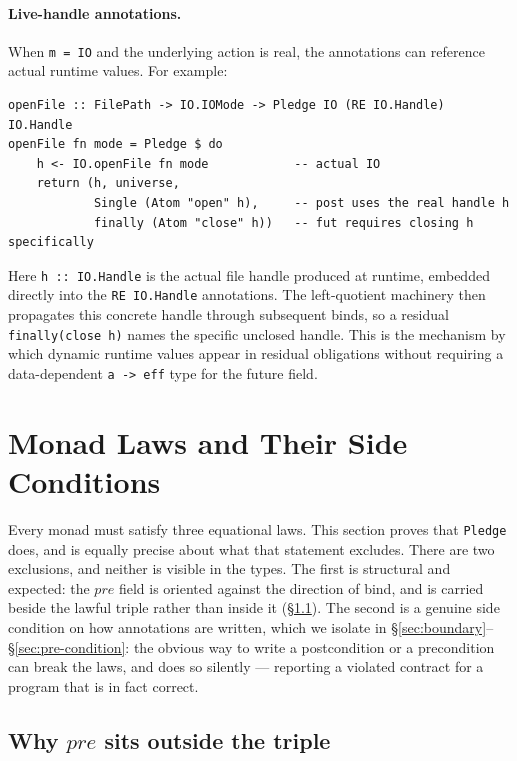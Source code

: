 \documentclass[acmsmall,screen]{acmart}
\newcommand{\pre}{\mathit{pre}}
\begin{document}
\paragraph{Live-handle annotations.}
When \lstinline{m = IO} and the underlying action is real, the
annotations can reference actual runtime values.
For example:
\begin{lstlisting}
openFile :: FilePath -> IO.IOMode -> Pledge IO (RE IO.Handle) IO.Handle
openFile fn mode = Pledge $ do
    h <- IO.openFile fn mode            -- actual IO
    return (h, universe,
            Single (Atom "open" h),     -- post uses the real handle h
            finally (Atom "close" h))   -- fut requires closing h specifically
\end{lstlisting}
Here \lstinline{h :: IO.Handle} is the actual file handle produced at
runtime, embedded directly into the \lstinline{RE IO.Handle} annotations.
The left-quotient machinery then propagates this concrete handle through
subsequent binds, so a residual \lstinline{finally(close h)} names the
specific unclosed handle.
This is the mechanism by which dynamic runtime values appear in
residual obligations without requiring a data-dependent
\lstinline{a -> eff} type for the future field.

\section{Monad Laws and Their Side Conditions}
\label{sec:monad-laws}

Every monad must satisfy three equational laws.
This section proves that \lstinline{Pledge} does, and is equally precise
about what that statement excludes.
There are two exclusions, and neither is visible in the types.
The first is structural and expected: the $\pre$ field is oriented against
the direction of bind, and is carried beside the lawful triple rather than
inside it (\S\ref{sec:orientation}).
The second is a genuine side condition on how annotations are written, which
we isolate in \S\ref{sec:boundary}--\S\ref{sec:pre-condition}: the obvious
way to write a postcondition or a precondition can break the laws, and does
so silently --- reporting a violated contract for a program that is in fact
correct.

\subsection{Why \texorpdfstring{$\pre$}{pre} sits outside the triple}
\label{sec:orientation}
\end{document}
